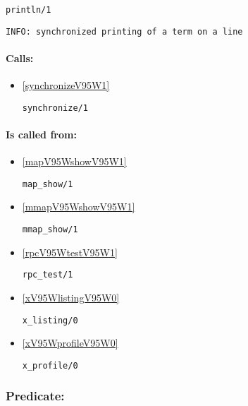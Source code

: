 \begin{verbatim}
println/1
\end{verbatim}

{\small \begin{verbatim}
INFO: synchronized printing of a term on a line

\end{verbatim}}
\paragraph{Calls:} 
\begin{itemize}
\item \ref{synchronizeV95W1} 
\begin{verbatim}
synchronize/1
\end{verbatim}

\end{itemize}
\paragraph{Is called from:} 
\begin{itemize}
\item \ref{mapV95WshowV95W1} 
\begin{verbatim}
map_show/1
\end{verbatim}

\item \ref{mmapV95WshowV95W1} 
\begin{verbatim}
mmap_show/1
\end{verbatim}

\item \ref{rpcV95WtestV95W1} 
\begin{verbatim}
rpc_test/1
\end{verbatim}

\item \ref{xV95WlistingV95W0} 
\begin{verbatim}
x_listing/0
\end{verbatim}

\item \ref{xV95WprofileV95W0} 
\begin{verbatim}
x_profile/0
\end{verbatim}

\end{itemize}

\subsubsection{Predicate:} \label{processV95WtermV95W3}

